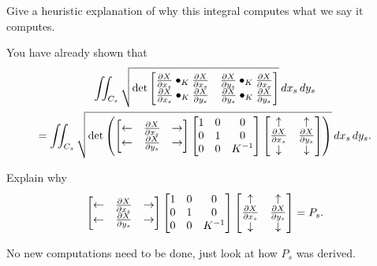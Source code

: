 \documentclass[newpage,hints,handout]{ximera}
\begin{document}
\begin{problem}
  Give a heuristic explanation of why this integral computes what we
  say it computes.
\end{problem}

You have already shown that
\begin{multline*}
  \iint_{C_s} \sqrt{
    \det
    \begin{bmatrix}
      \pp[X]{x_s}\bullet_K \pp[X]{x_s} & \pp[X]{y_s}\bullet_K \pp[X]{x_s} \\
      \pp[X]{x_s}\bullet_K \pp[X]{y_s} & \pp[X]{y_s}\bullet_K \pp[X]{y_s}
    \end{bmatrix}
  }\d x_s\d y_s \\
  =\iint_{C_s} \sqrt{
    \det\left(
      \begin{bmatrix}
        \leftarrow & \pp[X]{x_s} & \rightarrow \\
        \leftarrow & \pp[X]{y_s} & \rightarrow
      \end{bmatrix}
      \begin{bmatrix}
        1 & 0 & 0\\
        0 & 1 & 0\\
        0 & 0 & K^{-1}
      \end{bmatrix}
      \begin{bmatrix}
        \uparrow & \uparrow \\
        \pp[X]{x_s} & \pp[X]{y_s} \\
        \downarrow & \downarrow
      \end{bmatrix}\right)
}\d x_s\d y_s.
\end{multline*}

\begin{problem}
  Explain why
  \[
  \begin{bmatrix}
    \leftarrow & \pp[X]{x_s} & \rightarrow \\
    \leftarrow & \pp[X]{y_s} & \rightarrow
  \end{bmatrix}
  \begin{bmatrix}
    1 & 0 & 0\\
    0 & 1 & 0\\
    0 & 0 & K^{-1}
  \end{bmatrix}
  \begin{bmatrix}
    \uparrow & \uparrow \\
    \pp[X]{x_s} & \pp[X]{y_s} \\
    \downarrow & \downarrow
  \end{bmatrix} =P_s.
  \]
  \begin{hint}
    No new computations need to be done, just look at how $P_s$ was derived.
  \end{hint}
\end{problem}
\end{document}
